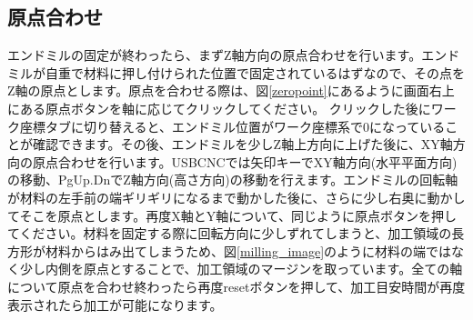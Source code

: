 \documentclass[b5paper, 9pt, twocolumn, titlepage,openany]{jsbook}%
\begin{document}
\subsection{原点合わせ}
エンドミルの固定が終わったら、まずZ軸方向の原点合わせを行います。エンドミルが自重で材料に押し付けられた位置で固定されているはずなので、その点をZ軸の原点とします。原点を合わせる際は、図\ref{zeropoint}にあるように画面右上にある原点ボタンを軸に応じてクリックしてください。 クリックした後にワーク座標タブに切り替えると、エンドミル位置がワーク座標系で0になっていることが確認できます。その後、エンドミルを少しZ軸上方向に上げた後に、XY軸方向の原点合わせを行います。USBCNCでは矢印キーでXY軸方向(水平平面方向)の移動、PgUp.DnでZ軸方向(高さ方向)の移動を行えます。エンドミルの回転軸が材料の左手前の端ギリギリになるまで動かした後に、さらに少し右奥に動かしてそこを原点とします。再度X軸とY軸について、同じように原点ボタンを押してください。材料を固定する際に回転方向に少しずれてしまうと、加工領域の長方形が材料からはみ出てしまうため、図\ref{milling_image}のように材料の端ではなく少し内側を原点とすることで、加工領域のマージンを取っています。全ての軸について原点を合わせ終わったら再度resetボタンを押して、加工目安時間が再度表示されたら加工が可能になります。\\
\end{document}
